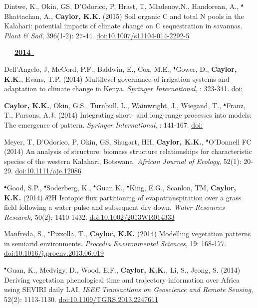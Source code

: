 \begin{etaremune}
\item Dintwe, K., Okin, GS, D'Odorico, P, Hrast, T, Mladenov,N., Handorean, A., $^{\blacktriangle}$Bhattachan, A., \textbf{ Caylor, K.K.} (2015) Soil organic C and total N pools in the Kalahari: potential impacts of climate change on C sequestration in savannas. \emph{Plant \& Soil}, 396(1-2): 27-44. \href{https://doi.org/10.1007/s11104-014-2292-5}{doi:10.1007/s11104-014-2292-5}

\vspace{0.1in}
\mbox{\ \ \ \underline{\textbf{2014 }}}
\vspace{0.1in}

\item Dell'Angelo, J, McCord, P.F., Baldwin, E., Cox, M.E., $^{\blacklozenge}$Gower, D., \textbf{ Caylor, K.K.}, Evans, T.P. (2014) Multilevel governance of irrigation systems and adaptation to climate change in Kenya. \emph{Springer International}, : 323-341. \href{https://doi.org/}{doi:}
\item \textbf{ Caylor, K.K.}, Okin, G.S., Turnbull, L., Wainwright, J., Wiegand, T., $^{\blacktriangle}$Franz, T., Parsons, A.J. (2014) Integrating short- and long-range processes into models: The emergence of pattern. \emph{Springer International}, : 141-167. \href{https://doi.org/}{doi:}
\item Meyer, T, D'Odorico, P, Okin, GS, Shugart, HH, \textbf{ Caylor, K.K.}, $^{\blacktriangle}$O'Donnell FC (2014) An analysis of structure: biomass structure relationships for characteristic species of the western Kalahari, Botswana. \emph{African Journal of Ecology}, 52(1): 20-29. \href{https://doi.org/10.1111/aje.12086}{doi:10.1111/aje.12086}
\item $^{\blacktriangle}$Good, S.P., $^{\blacklozenge}$Soderberg, K., $^{\bullet}$Guan K., $^{\blacklozenge}$King, E.G., Scanlon, TM, \textbf{ Caylor, K.K.} (2014) $\delta$2H Isotopic flux partitioning of evapotranspiration over a grass field following a water pulse and subsequent dry down. \emph{Water Resources Research}, 50(2): 1410-1432. \href{https://doi.org/10.1002/2013WR014333}{doi:10.1002/2013WR014333}
\item Manfreda, S., $^{\star}$Pizzolla, T., \textbf{ Caylor, K.K.} (2014) Modelling vegetation patterns in semiarid environments. \emph{Procedia Environmental Sciences}, 19: 168-177. \href{https://doi.org/10.1016/j.proenv.2013.06.019}{doi:10.1016/j.proenv.2013.06.019}
\item $^{\bullet}$Guan, K., Medvigy, D., Wood, E.F., \textbf{ Caylor, K.K.}, Li, S., Jeong, S. (2014) Deriving vegetation phenological time and trajectory information over Africa using SEVIRI daily LAI. \emph{IEEE Transactions on Geoscience and Remote Sensing}, 52(2): 1113-1130. \href{https://doi.org/10.1109/TGRS.2013.2247611}{doi:10.1109/TGRS.2013.2247611}

\end{etaremune}
